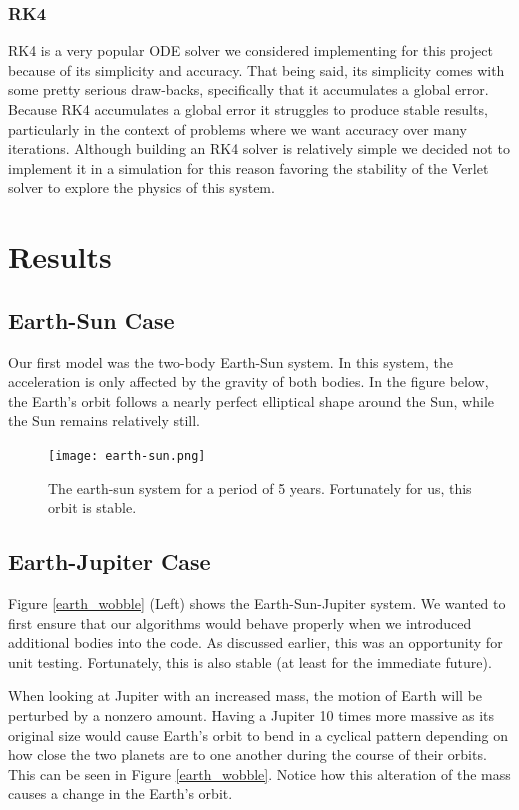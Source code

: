 \documentclass{article}
\begin{document}
\subsubsection{RK4}
RK4 is a very popular ODE solver we considered implementing for this project because of its simplicity and accuracy. That being said, its simplicity comes with some pretty serious draw-backs, specifically that it accumulates a global error. Because RK4 accumulates a global error it struggles to produce stable results, particularly in the context of problems where we want accuracy over many iterations. Although building an RK4 solver is relatively simple we decided not to implement it in a simulation for this reason favoring the stability of the Verlet solver to explore the physics of this system.

\section{Results}
\subsection{Earth-Sun Case}
Our first model was the two-body Earth-Sun system. In this system, the acceleration is only affected by the gravity of both bodies. In the figure below, the Earth's orbit follows a nearly perfect elliptical shape around the Sun, while the Sun remains relatively still. 

\begin{figure}[h!]
\centering
\texttt{[image: earth-sun.png]}
\caption{The earth-sun system for a period of 5 years. Fortunately for us, this orbit is stable.}
\label{earth_sun}
\end{figure}
\subsection{Earth-Jupiter Case}
Figure \ref{earth_wobble} (Left) shows the Earth-Sun-Jupiter system. We wanted to first ensure that our algorithms would behave properly when we introduced additional bodies into the code. As discussed earlier, this was an opportunity for unit testing. Fortunately, this is also stable (at least for the immediate future). 

When looking at Jupiter with an increased mass, the motion of Earth will be perturbed by a nonzero amount. Having a Jupiter 10 times more massive as its original size would cause Earth's orbit to bend in a cyclical pattern depending on how close the two planets are to one another during the course of their orbits. This can be seen in Figure \ref{earth_wobble}. Notice how this alteration of the mass causes a change in the Earth's orbit.
\end{document}
